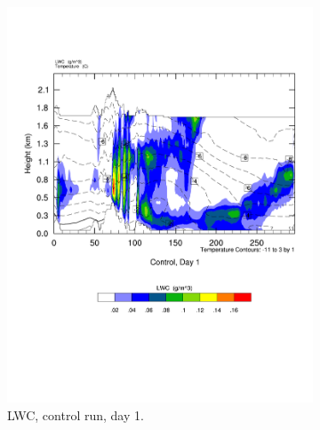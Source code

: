 \begin{figure}[ht]
    \centering
    \begin{subfigure}{0.48\textwidth}
        \centering
        \includegraphics[width=\textwidth]{results/control/crossSec_LWC_Control_Day1.pdf}
        \caption{LWC, control run, day 1.}
        \label{subfig:cross_LWC_day1}
    \end{subfigure}
    \begin{subfigure}{0.48\textwidth}
        \centering

\end{subfigure}
\end{figure}
